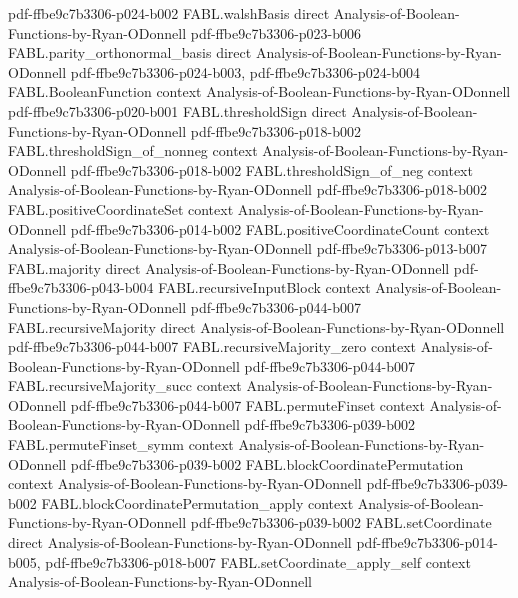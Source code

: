\begin{theorem}
  {pdf-ffbe9c7b3306-p024-b002}
\proofstep
  {FABL.walshBasis}
  {direct}
  {Analysis-of-Boolean-Functions-by-Ryan-ODonnell}
  {pdf-ffbe9c7b3306-p023-b006}
\proofstep
  {FABL.parity_orthonormal_basis}
  {direct}
  {Analysis-of-Boolean-Functions-by-Ryan-ODonnell}
  {pdf-ffbe9c7b3306-p024-b003,
    pdf-ffbe9c7b3306-p024-b004}
\proofstep
  {FABL.BooleanFunction}
  {context}
  {Analysis-of-Boolean-Functions-by-Ryan-ODonnell}
  {pdf-ffbe9c7b3306-p020-b001}
\proofstep
  {FABL.thresholdSign}
  {direct}
  {Analysis-of-Boolean-Functions-by-Ryan-ODonnell}
  {pdf-ffbe9c7b3306-p018-b002}
\proofstep
  {FABL.thresholdSign_of_nonneg}
  {context}
  {Analysis-of-Boolean-Functions-by-Ryan-ODonnell}
  {pdf-ffbe9c7b3306-p018-b002}
\proofstep
  {FABL.thresholdSign_of_neg}
  {context}
  {Analysis-of-Boolean-Functions-by-Ryan-ODonnell}
  {pdf-ffbe9c7b3306-p018-b002}
\proofstep
  {FABL.positiveCoordinateSet}
  {context}
  {Analysis-of-Boolean-Functions-by-Ryan-ODonnell}
  {pdf-ffbe9c7b3306-p014-b002}
\proofstep
  {FABL.positiveCoordinateCount}
  {context}
  {Analysis-of-Boolean-Functions-by-Ryan-ODonnell}
  {pdf-ffbe9c7b3306-p013-b007}
\proofstep
  {FABL.majority}
  {direct}
  {Analysis-of-Boolean-Functions-by-Ryan-ODonnell}
  {pdf-ffbe9c7b3306-p043-b004}
\proofstep
  {FABL.recursiveInputBlock}
  {context}
  {Analysis-of-Boolean-Functions-by-Ryan-ODonnell}
  {pdf-ffbe9c7b3306-p044-b007}
\proofstep
  {FABL.recursiveMajority}
  {direct}
  {Analysis-of-Boolean-Functions-by-Ryan-ODonnell}
  {pdf-ffbe9c7b3306-p044-b007}
\proofstep
  {FABL.recursiveMajority_zero}
  {context}
  {Analysis-of-Boolean-Functions-by-Ryan-ODonnell}
  {pdf-ffbe9c7b3306-p044-b007}
\proofstep
  {FABL.recursiveMajority_succ}
  {context}
  {Analysis-of-Boolean-Functions-by-Ryan-ODonnell}
  {pdf-ffbe9c7b3306-p044-b007}
\proofstep
  {FABL.permuteFinset}
  {context}
  {Analysis-of-Boolean-Functions-by-Ryan-ODonnell}
  {pdf-ffbe9c7b3306-p039-b002}
\proofstep
  {FABL.permuteFinset_symm}
  {context}
  {Analysis-of-Boolean-Functions-by-Ryan-ODonnell}
  {pdf-ffbe9c7b3306-p039-b002}
\proofstep
  {FABL.blockCoordinatePermutation}
  {context}
  {Analysis-of-Boolean-Functions-by-Ryan-ODonnell}
  {pdf-ffbe9c7b3306-p039-b002}
\proofstep
  {FABL.blockCoordinatePermutation_apply}
  {context}
  {Analysis-of-Boolean-Functions-by-Ryan-ODonnell}
  {pdf-ffbe9c7b3306-p039-b002}
\proofstep
  {FABL.setCoordinate}
  {direct}
  {Analysis-of-Boolean-Functions-by-Ryan-ODonnell}
  {pdf-ffbe9c7b3306-p014-b005,
    pdf-ffbe9c7b3306-p018-b007}
\proofstep
  {FABL.setCoordinate_apply_self}
  {context}
  {Analysis-of-Boolean-Functions-by-Ryan-ODonnell}

\end{theorem}

